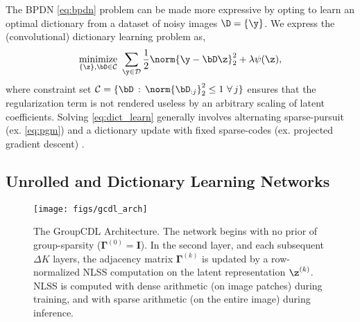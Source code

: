 \documentclass[lettersize,journal]{IEEEtran}
\newcommand{\ADJMAT}{\boldsymbol{\Gamma}}
\begin{document}
The BPDN \eqref{eq:bpdn} problem can be made more expressive by opting to learn
an optimal dictionary from a dataset of noisy images $\D = \{\y\}$. We express
the (convolutional) dictionary learning problem as,
\begin{equation} \label{eq:dict_learn}
\underset{\{\z\}, \bD \in \mathcal{C}}{\mathrm{minimize}} ~ 
\sum_{\y \in \mathcal{D}} \frac{1}{2}\norm{\y -\bD\z}_2^2 + \lambda
\psi(\z),
\end{equation}
where constraint set $\mathcal{C} = \{ \bD \, : \, \norm{\bD_{:j}}_2^2 \leq 1 ~
\forall \, j \}$ ensures that the regularization term is not rendered useless by
an arbitrary scaling of latent coefficients. Solving \eqref{eq:dict_learn}
generally involves alternating sparse-pursuit (ex. \eqref{eq:pgm}) and a
dictionary update with fixed sparse-codes (ex. projected gradient descent)
\cite{mairal2009online}. 

\subsection{Unrolled and Dictionary Learning Networks}
\begin{figure*}[thb]
    \centering
    \texttt{[image: figs/gcdl\_arch]}
    \caption{The GroupCDL Architecture. The network begins with no prior of group-sparsity ($\ADJMAT^{(0)} = \bm{I}$). In the second layer, and each subsequent $\Delta K$ layers, the adjacency matrix $\ADJMAT^{(k)}$ is updated by a row-normalized NLSS computation on the latent representation $\z^{(k)}$. NLSS is computed with dense arithmetic (on image patches) during training, and with sparse arithmetic (on the entire image) during inference.}
    \label{fig:arch}
\end{figure*}
 
\end{document}
